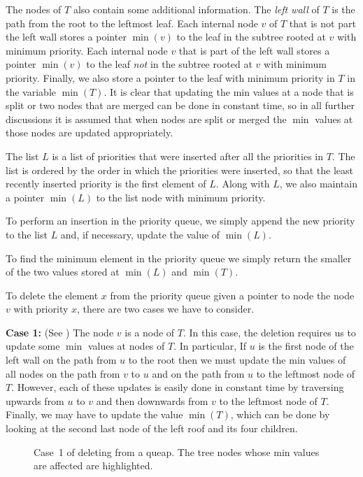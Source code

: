 {The nodes of $T$ also contain some additional information.  The
\emph{left wall} of $T$ is the path from the root to the leftmost leaf.
Each internal node $v$ of $T$ that is not part the left wall stores a
pointer $\min(v)$ to the leaf in the subtree rooted at $v$ with
minimum priority.  Each internal node $v$ that is part of the left
wall stores a pointer $\min(v)$ to the leaf \emph{not} in the subtree
rooted at $v$ with minimum priority.  Finally, we also store a pointer
to the leaf with minimum priority in $T$ in the variable $\min(T)$.
It is clear that updating the min values at a node that is split or
two nodes that are merged can be done in constant time, so in all
further discussions it is assumed that when nodes are split or merged
the $\min$ values at those nodes are updated appropriately.

The list $L$ is a list of priorities that were inserted after all the
priorities in $T$.  The list is ordered by the order in which the
priorities were inserted, so that the least recently inserted priority
is the first element of $L$.  Along with $L$, we also maintain a
pointer $\min(L)$ to the list node with minimum priority.

To perform an insertion in the priority queue, we simply append the
new priority to the list $L$ and, if necessary, update the value of
$\min(L)$.

To find the minimum element in the priority queue we simply return the
smaller of the two values stored at $\min(L)$ and $\min(T)$.

To delete the element $x$ from the priority queue given a pointer to
node the node $v$ with priority $x$, there are two cases we have to
consider.  

\noindent\textbf{Case 1:} (See ) 
The node $v$ is a node of $T$.  In this case, the deletion requires us
to update some $\min$ values at nodes of $T$.  In particular, If $u$
is the first node of the left wall on the path from $u$ to the root
then we must update the min values of all nodes on the path from $v$
to $u$ and on the path from $u$ to the leftmost node of $T$.  However,
each of these updates is easily done in constant time by traversing
upwards from $u$ to $v$ and then downwards from $v$ to the leftmost
node of $T$.  Finally, we may have to update the value $\min(T)$,
which can be done by looking at the second last node of the left roof
and its four children.

\begin{figure}
\caption{Case~1 of deleting from a queap.  The tree nodes whose min values
 are affected are highlighted.}
\end{figure}

}
